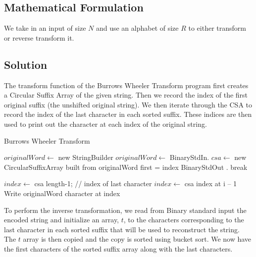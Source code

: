 \documentclass[12pt]{article}
\begin{document}

\subsection{Mathematical Formulation}
We take in an input of size $N$ and use an alphabet of size $R$ to either
transform or reverse transform it.


\subsection{Solution}
The transform function of the Burrows Wheeler Transform program first creates a
Circular Suffix Array of the given string. Then we record the index of the first
original suffix (the unshifted original string). We then iterate through the CSA
to record the index of the last character in each sorted suffix. These indices are
then used to print out the character at each index of the original string.

\begin{algorithm} [H]
\caption{Burrows Wheeler Transform}
\begin{algorithmic}
	\State $originalWord \gets$ new StringBuilder
		\State $originalWord \gets$ BinaryStdIn. { }
	\EndWhile
	\State $csa \gets$ new CircularSuffixArray built from originalWord
			\State first = index
			\State BinaryStdOut .
			\State break
		\EndIf
	\EndFor

			\State $index \gets$ csa length-1; // index of last character
		\Else
			\State $index \gets$ csa index at i – 1
		\EndIf
		\State Write originalWord character at index
	\EndFor
\EndProcedure
\end{algorithmic}
\end{algorithm}

To perform the inverse transformation, we read from Binary standard input the
encoded string and initialize an array,  $t$, to the characters corresponding
to the last character in each sorted suffix that will be used to reconstruct
the string. The $t$ array is then copied and the copy is sorted using bucket
sort. We now have the first characters of the sorted suffix array along with
the last characters.
\end{document}
